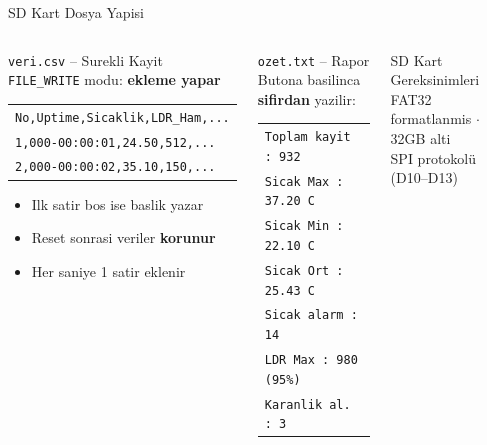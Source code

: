 \begin{frame}{SD Kart Dosya Yapisi}
  \begin{columns}[T]
      \begin{block}{\texttt{veri.csv} -- Surekli Kayit}
        \scriptsize
        \texttt{FILE\_WRITE} modu: \textbf{ekleme yapar}\\[4pt]
        \begin{tabular}{|l|}
          \hline
          \texttt{No,Uptime,Sicaklik,LDR\_Ham,...}\\
          \texttt{1,000-00:00:01,24.50,512,...}\\
          \texttt{2,000-00:00:02,35.10,150,...}\\
          \hline
        \end{tabular}
        \vspace{4pt}
        \begin{itemize}
          \item Ilk satir bos ise baslik yazar
          \item Reset sonrasi veriler \textbf{korunur}
          \item Her saniye 1 satir eklenir
        \end{itemize}
      \end{block}

      \begin{block}{\texttt{ozet.txt} -- Rapor}
        \scriptsize
        Butona basilinca \textbf{sifirdan} yazilir:\\[4pt]
        \begin{tabular}{|l|}
          \hline
          \texttt{Toplam kayit : 932}\\
          \texttt{Sicak Max    : 37.20 C}\\
          \texttt{Sicak Min    : 22.10 C}\\
          \texttt{Sicak Ort    : 25.43 C}\\
          \texttt{Sicak alarm  : 14}\\
          \texttt{LDR Max      : 980 (95\%)}\\
          \texttt{Karanlik al. : 3}\\
          \hline
        \end{tabular}
      \end{block}
      \vspace{4pt}
      \begin{alertblock}{SD Kart Gereksinimleri}
        \scriptsize
        FAT32 formatlanmis $\cdot$ 32GB alti\\
        SPI protokolü (D10--D13)
      \end{alertblock}
  \end{columns}
\end{frame}
